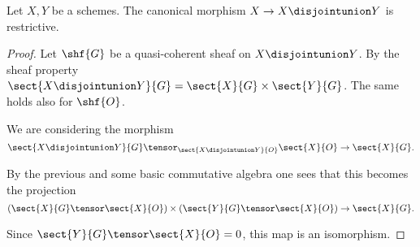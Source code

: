 \begin{lemma}
Let $X,Y$ be a schemes.
The canonical morphism $X \rightarrow X \disjointunion Y$ is restrictive.
\end{lemma}

\begin{proof}
Let $\shf{G}$ be a quasi-coherent sheaf on $X \disjointunion Y$.
By the sheaf property $\sect{X \disjointunion Y}{G} = \sect{X}{G} \times \sect{Y}{G}$.
The same holds also for $\shf{O}$.

We are considering the morphism
\[
\sect{X \disjointunion Y}{G} \tensor_{\sect{X \disjointunion Y}{O}} \sect{X}{O} \rightarrow \sect{X}{G}.
\]

By the previous and some basic commutative algebra one sees that this becomes the projection
\[
(\sect{X}{G} \tensor \sect{X}{O}) \times (\sect{Y}{G} \tensor \sect{X}{O}) \rightarrow \sect{X}{G}.
\]

Since $\sect{Y}{G} \tensor \sect{X}{O} = 0$, this map is an isomorphism.
\end{proof}


\begin{lemma}

\end{lemma}